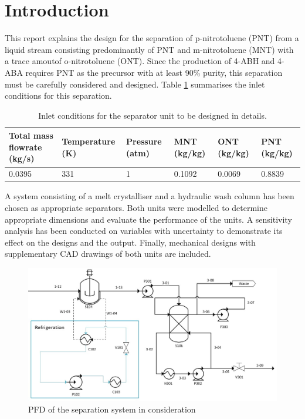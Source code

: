 \section{Introduction}

This report explains the design for the separation of p-nitrotoluene (PNT) from a liquid stream consisting predominantly of PNT and m-nitrotoluene (MNT) with a trace amoutof o-nitrotoluene (ONT). Since the production of 4-ABH and 4-ABA requires PNT as the precursor with at least 90\% purity, this separation must be carefully considered and designed. Table \ref{tab:inlet crystalliser} summarises the inlet conditions for this separation. 

\begin{table}[h] \label{tab:inlet crystalliser}
\centering
\caption{Inlet conditions for the separator unit to be designed in details.}
\begin{tabular}{@{}l|l|l|l|l|l@{}}
\toprule
\textbf{Total mass flowrate (kg/s)}  & \textbf{Temperature (K)}  & \textbf{Pressure (atm)} & \textbf{MNT (kg/kg)} & \textbf{ONT (kg/kg)} & \textbf{PNT (kg/kg)}   \\ \midrule
0.0395  & 331 &  1 & 0.1092 & 0.0069  &   0.8839 \\ \bottomrule
\end{tabular}
\end{table}

A system consisting of a melt crystalliser and a hydraulic wash column has been chosen as appropriate separators. Both units were modelled to determine appropriate dimensions and evaluate the performance of the units. A sensitivity analysis has been conducted on variables with uncertainty to demonstrate its effect on the designs and the output. Finally, mechanical designs with supplementary CAD drawings of both units are included.


\begin{figure}[h]
    \centering
    \includegraphics[scale=0.5]{chapters/3-separation/figures/Crystallizer PFD.jpg}
    \caption{PFD of the separation system in consideration}
    \label{fig:crystalliser schematic}
\end{figure}


